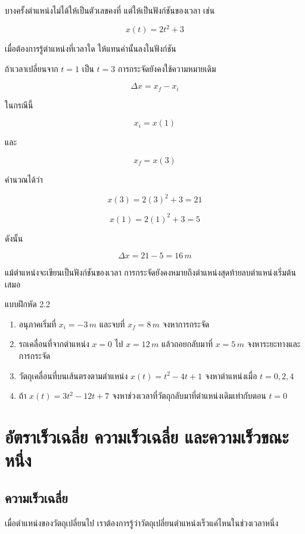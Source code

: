 บางครั้งตำแหน่งไม่ได้ให้เป็นตัวเลขคงที่ แต่ให้เป็นฟังก์ชันของเวลา เช่น

\[
x(t)=2t^2+3
\]

เมื่อต้องการรู้ตำแหน่งที่เวลาใด ให้แทนค่านั้นลงในฟังก์ชัน

ถ้าเวลาเปลี่ยนจาก $t=1$ เป็น $t=3$ การกระจัดยังคงใช้ความหมายเดิม

\[
\Delta x=x_f-x_i
\]

ในกรณีนี้

\[
x_i=x(1)
\]

และ

\[
x_f=x(3)
\]

คำนวณได้ว่า

\[
x(3)=2(3)^2+3=21
\]

\[
x(1)=2(1)^2+3=5
\]

ดังนั้น

\[
\Delta x=21-5=16\,\si{m}
\]

\begin{tcolorbox}[title=ข้อควรจำ]
แม้ตำแหน่งจะเขียนเป็นฟังก์ชันของเวลา การกระจัดยังคงหมายถึงตำแหน่งสุดท้ายลบตำแหน่งเริ่มต้นเสมอ
\end{tcolorbox}

\begin{exercisebox}{แบบฝึกหัด 2.2}
\begin{enumerate}
    \item อนุภาคเริ่มที่ $x_i=-3\,\si{m}$ และจบที่ $x_f=8\,\si{m}$ จงหาการกระจัด
    \item รถเคลื่อนที่จากตำแหน่ง $x=0$ ไป $x=12\,\si{m}$ แล้วถอยกลับมาที่ $x=5\,\si{m}$ จงหาระยะทางและการกระจัด
    \item วัตถุเคลื่อนที่บนเส้นตรงตามตำแหน่ง $x(t)=t^2-4t+1$ จงหาตำแหน่งเมื่อ $t=0,2,4$
    \item ถ้า $x(t)=3t^2-12t+7$ จงหาช่วงเวลาที่วัตถุกลับมาที่ตำแหน่งเดิมเท่ากับตอน $t=0$
\end{enumerate}
\end{exercisebox}

\section{อัตราเร็วเฉลี่ย ความเร็วเฉลี่ย และความเร็วขณะหนึ่ง}

\subsection{ความเร็วเฉลี่ย}

เมื่อตำแหน่งของวัตถุเปลี่ยนไป เราต้องการรู้ว่าวัตถุเปลี่ยนตำแหน่งเร็วแค่ไหนในช่วงเวลาหนึ่ง

